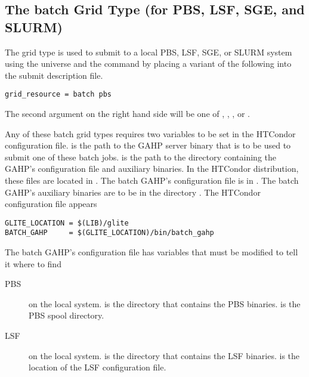 \subsection{\label{sec:batch}The batch Grid Type (for PBS, LSF, SGE, and SLURM) }
\label{sec:PBS}
\label{sec:LSF}
\label{sec:SGE}
\label{sec:SLURM}

The  grid type is used to submit to a local PBS, LSF, SGE, or SLURM
system using the  universe and the
 command by placing a variant of the following
into the submit description file.
\begin{verbatim}
grid_resource = batch pbs
\end{verbatim}

The second argument on the right hand side will be one of
, , , or .

Any of these batch grid types requires two variables to be set in the HTCondor
configuration file.
 is the path to the GAHP server binary that is to be
used to submit one of these batch jobs.
 is the path to the directory containing the GAHP's
configuration file and auxiliary binaries.
In the HTCondor distribution, these files are located in 
.
The batch GAHP's configuration file is in
.
The batch GAHP's auxiliary binaries
are to be in the directory .
The HTCondor configuration file appears

\footnotesize
\begin{verbatim}
GLITE_LOCATION = $(LIB)/glite
BATCH_GAHP     = $(GLITE_LOCATION)/bin/batch_gahp
\end{verbatim}
\normalsize

The batch GAHP's configuration file has variables that must be
modified to tell it where to find 
\begin{description}
\item[PBS] on the local system.
   is the directory that contains the PBS binaries.
   is the PBS spool directory.
\item[LSF] on the local system.
   is the directory that contains the LSF binaries.
   is the location of the LSF configuration file.
\end{description}

